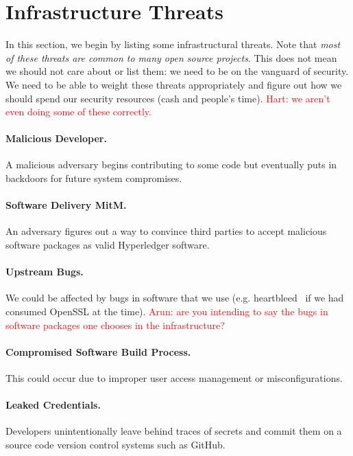 
\section{Infrastructure Threats}

In this section, we begin by listing some infrastructural threats.  Note that \emph{most of these threats are common to many open source projects}.  This does not mean we should not care about or list them:  we need to be on the vanguard of security.  We need to be able to weight these threats appropriately and figure out how we should spend our security resources (cash and people's time). \textcolor{red}{Hart: we aren't even doing some of these correctly.}

\paragraph{Malicious Developer.}  A malicious adversary begins contributing to some code but eventually puts in backdoors for future system compromises.

\paragraph{Software Delivery MitM.}  An adversary figures out a way to convince third parties to accept malicious software packages as valid Hyperledger software.

\paragraph{Upstream Bugs.}  We could be affected by bugs in software that we use (e.g. heartbleed~\cite{durumeric2014matter} if we had consumed OpenSSL at the time). \textcolor{red}{Arun: are you intending to say the bugs in software packages one chooses in the infrastructure?}

\paragraph{Compromised Software Build Process.}  This could occur due to improper user access management or misconfigurations.

\paragraph{Leaked Credentials.} Developers unintentionally leave behind traces of secrets and commit them on a source code version control systems such as GitHub.

